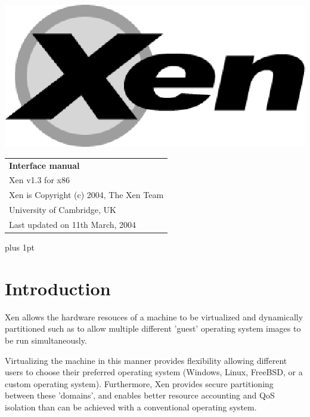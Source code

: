 \documentclass[11pt,twoside,final,openright]{xenstyle}
\begin{document}
\pagestyle{empty}
\begin{center}
\vspace*{\fill}
\includegraphics{eps/xenlogo.eps}
\vfill
\vfill
\vfill
\begin{tabular}{l}
{\Huge \bf Interface manual} \\[4mm]
{\huge Xen v1.3 for x86} \\[80mm]

{\Large Xen is Copyright (c) 2004, The Xen Team} \\[3mm]
{\Large University of Cambridge, UK} \\[20mm]
{\large Last updated on 11th March, 2004}
\end{tabular}
\vfill
\end{center}
\cleardoublepage

\pagestyle{plain}
{ \parskip 0pt plus 1pt
  \tableofcontents }
\cleardoublepage

\raggedbottom
{}
\parindent=0pt
\renewcommand{\topfraction}{.8}
\renewcommand{\bottomfraction}{.8}
\renewcommand{\textfraction}{.2}
\renewcommand{\floatpagefraction}{.8}

\chapter{Introduction}
Xen allows the hardware resouces of a machine to be virtualized and
dynamically partitioned such as to allow multiple different 'guest'
operating system images to be run simultaneously.

Virtualizing the machine in this manner provides flexibility allowing
different users to choose their preferred operating system (Windows,
Linux, FreeBSD, or a custom operating system). Furthermore, Xen provides
secure partitioning between these 'domains', and enables better resource
accounting and QoS isolation than can be achieved with a conventional
operating system.
\end{document}
